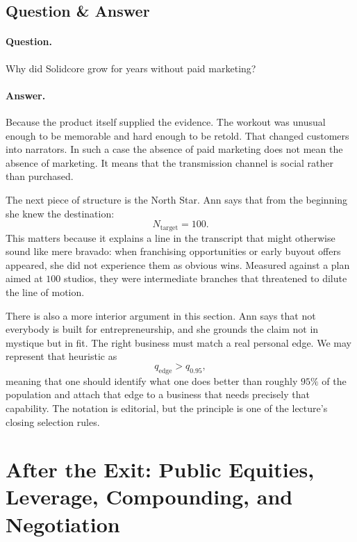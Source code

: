 \subsection{Question \& Answer}

\paragraph{Question.} Why did Solidcore grow for years without paid marketing?

\paragraph{Answer.} Because the product itself supplied the evidence. The workout was unusual enough to be memorable and hard enough to be retold. That changed customers into narrators. In such a case the absence of paid marketing does not mean the absence of marketing. It means that the transmission channel is social rather than purchased.

The next piece of structure is the North Star. Ann says that from the beginning she knew the destination:
\begin{equation}
N_{\mathrm{target}} = 100.
\end{equation}
This matters because it explains a line in the transcript that might otherwise sound like mere bravado: when franchising opportunities or early buyout offers appeared, she did not experience them as obvious wins. Measured against a plan aimed at \(100\) studios, they were intermediate branches that threatened to dilute the line of motion.

There is also a more interior argument in this section. Ann says that not everybody is built for entrepreneurship, and she grounds the claim not in mystique but in fit. The right business must match a real personal edge. We may represent that heuristic as
\begin{equation}
q_{\mathrm{edge}} > q_{0.95},
\end{equation}
meaning that one should identify what one does better than roughly \(95\%\) of the population and attach that edge to a business that needs precisely that capability. The notation is editorial, but the principle is one of the lecture's closing selection rules.

\section{After the Exit: Public Equities, Leverage, Compounding, and Negotiation}

